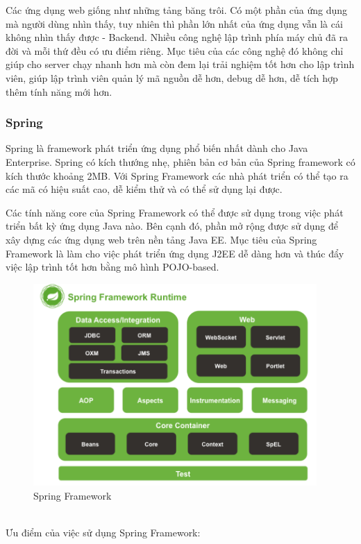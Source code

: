 Các ứng dụng web giống như những tảng băng trôi. Có một phần của ứng dụng mà người dùng nhìn thấy, tuy nhiên thì phần lớn nhất của ứng dụng vẫn là cái không nhìn thấy được - Backend. Nhiều công nghệ lập trình phía máy chủ đã ra đời và mỗi thứ đều có ưu điểm riêng. Mục tiêu của các công nghệ đó không chỉ giúp cho server chạy nhanh hơn mà còn đem lại trải nghiệm tốt hơn cho lập trình viên, giúp lập trình viên quản lý mã nguồn dễ hơn, debug dễ hơn, dễ tích hợp thêm tính năng mới hơn.
\subsubsection{Spring}
Spring là framework phát triển ứng dụng phổ biến nhất dành cho Java Enterprise. Spring có kích thướng nhẹ, phiên bản cơ bản của Spring framework có kích thước khoảng 2MB. Với Spring Framework các nhà phát triển có thể tạo ra các mã có hiệu suất cao, dễ kiểm thử và có thể sử dụng lại được.\par
Các tính năng core của Spring Framework có thể được sử dụng trong việc phát triển bất kỳ ứng dụng Java nào. Bên cạnh đó, phần mở rộng được sử dụng để xây dựng các ứng dụng web trên nền tảng Java EE. Mục tiêu của Spring Framework là làm cho việc phát triển ứng dụng J2EE dễ dàng hơn và thúc đẩy việc lập trình tốt hơn bằng mô hình POJO-based.
\begin{figure}[h!]
    \begin{center}
        \includegraphics[width=10.8cm]{Image/Technical/spring_framework.png}
        \caption{Spring Framework}
        \label{spring}
    \end{center}
\end{figure}
\\
Ưu điểm của việc sử dụng Spring Framework:
